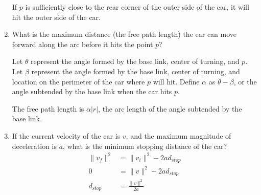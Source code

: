 \documentclass[11pt]{article}
\begin{document}
\begin{enumerate}[leftmargin=*]
    If $p$ is sufficiently close to the rear corner of the outer side of the
    car, it will hit the outer side of the car.


    \item
    What is the maximum distance (the free path length) the car can move forward
    along the arc before it hits the point $p$?

    Let $\theta$ represent the angle formed by the base link, center of turning,
    and $p$.
    Let $\beta$ represent the angle formed by the base link, center of turning,
    and location on the perimeter of the car where $p$ will hit.  Define
    $\alpha$ as $\theta - \beta$, or the angle subtended by the base link when
    the car hits $p$.

    The free path length is $\alpha \lvert r \rvert$, the arc length of the
    angle subtended by the base link.

    \item
    If the current velocity of the car is $v$, and the maximum magnitude of
    deceleration is $a$, what is the minimum stopping distance of the car?
    \begin{align*}
        \lVert v_f \rVert^2 &= \lVert v_i \rVert^2 - 2ad_{stop} \\
        0 &= \lVert v \rVert^2 - 2 a d_{stop} \\
        d_{stop} &= \frac{\lVert v \rVert^2}{2a}
    \end{align*}
\end{enumerate}
\end{document}
